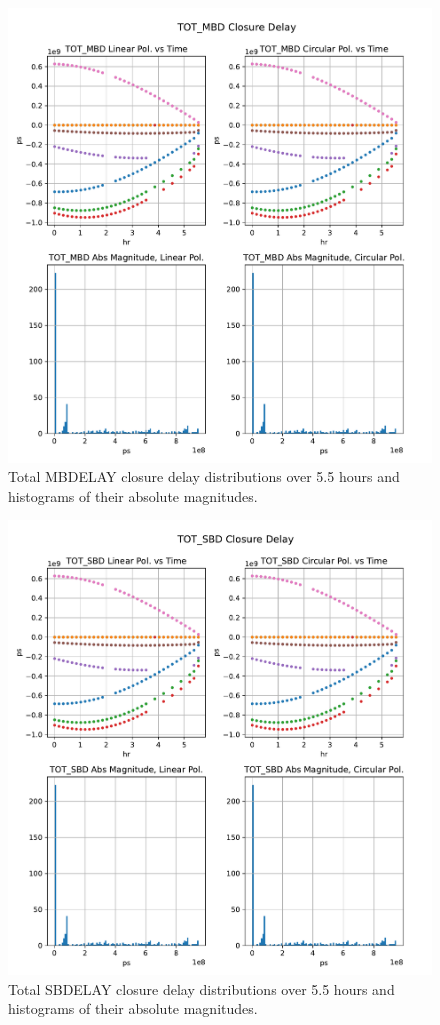 \documentclass[letterpaper,twoside,12pt]{article}
\begin{document}
\begin{figure}[ht!]
  \begin{center}
  \includegraphics[width=38pc]{TOT_MBD_Closure_Delay.pdf}
  \caption{\small Total MBDELAY closure delay distributions over 5.5 hours and histograms of their absolute magnitudes.}
  \label{tot_mbd}
  \end{center}
\end{figure}


\begin{figure}[ht!]
  \begin{center}
  \includegraphics[width=38pc]{TOT_SBD_Closure_Delay.pdf}
  \caption{\small Total SBDELAY closure delay distributions over 5.5 hours and histograms of their absolute magnitudes.}
  \label{tot_mbd}
  \end{center}
\end{figure}
\end{document}
